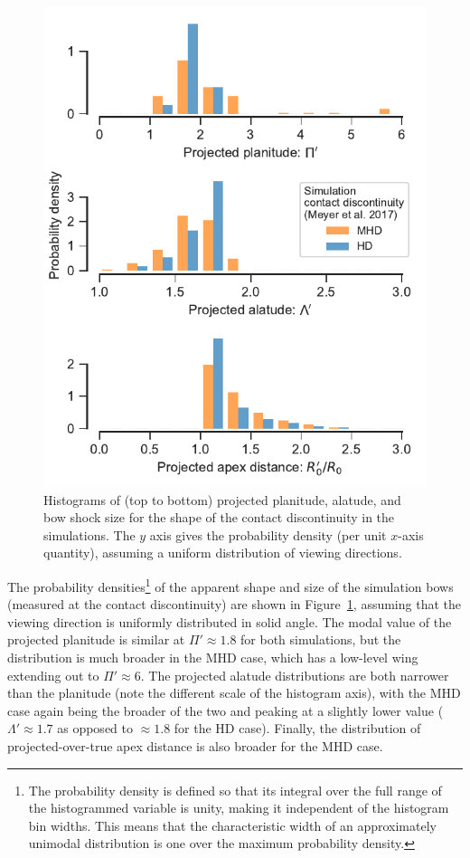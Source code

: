 \begin{figure}
  \centering
  \includegraphics[width=\linewidth]{figs/m17-histograms}
  \caption[]{Histograms of (top to bottom) projected planitude,
    alatude, and bow shock size for the shape of the contact
    discontinuity in the \citet{Meyer:2017a} simulations. The \(y\)
    axis gives the probability density (per unit \(x\)-axis quantity),
    assuming a uniform distribution of viewing directions.}
  \label{fig:sim-histograms}
\end{figure}

The probability densities\footnote{%
  The probability density is defined so that its integral over the
  full range of the histogrammed variable is unity, making it
  independent of the histogram bin widths.  This means that the
  characteristic width of an approximately unimodal distribution is
  one over the maximum probability density.} %
of the apparent shape and size of the simulation bows (measured at the
contact discontinuity) are shown in Figure~\ref{fig:sim-histograms},
assuming that the viewing direction is uniformly distributed in solid
angle.  The modal value of the projected planitude is similar at
\(\Pi' \approx 1.8\) for both simulations, but the distribution is much
broader in the MHD case, which has a low-level wing extending out to
\(\Pi' \approx 6\).  The projected alatude distributions are both narrower
than the planitude (note the different scale of the histogram axis),
with the MHD case again being the broader of the two and peaking at a
slightly lower value (\(\Lambda' \approx 1.7\) as opposed to
\(\approx 1.8\) for the HD case).  Finally, the distribution of
projected-over-true apex distance is also broader for the MHD case. 


